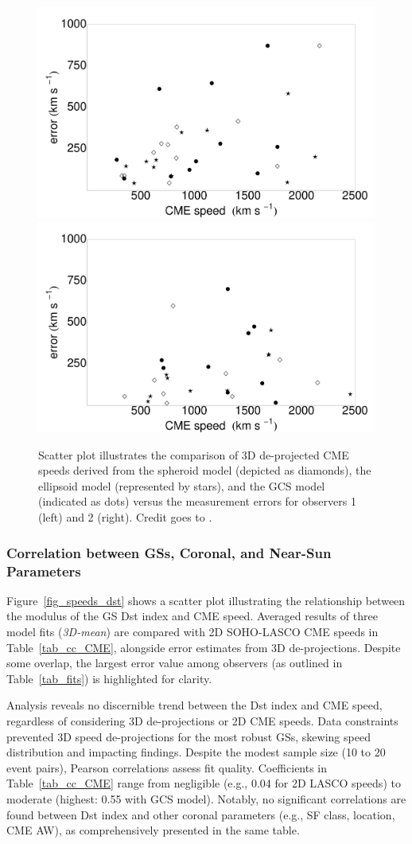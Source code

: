 \begin{figure}[!htp]
	\centering
	\includegraphics[width=0.48\hsize]{chapter2/figs/Fig_er_speed1.pdf}
	\includegraphics[width=0.48\hsize]{chapter2/figs/Fig_er_speed2.pdf}
	\caption{Scatter plot illustrates the comparison of 3D de-projected CME speeds derived from the spheroid model (depicted as diamonds), the ellipsoid model (represented by stars), and the GCS model (indicated as dots) versus the measurement errors for observers 1 (left) and 2 (right). Credit goes to \citet{miteva_2023}.}
	\label{fig_vcme_err}
\end{figure}

\subsubsection{Correlation between GSs, Coronal, and Near-Sun Parameters}
Figure~\ref{fig_speeds_dst} shows a scatter plot illustrating the relationship between the modulus of the GS Dst index and CME speed. Averaged results of three model fits (\textit{3D-mean}) are compared with 2D SOHO-LASCO CME speeds in Table~\ref{tab_cc_CME}, alongside error estimates from 3D de-projections. Despite some overlap, the largest error value among observers (as outlined in Table~\ref{tab_fits}) is highlighted for clarity.

Analysis reveals no discernible trend between the Dst index and CME speed, regardless of considering 3D de-projections or 2D CME speeds. Data constraints prevented 3D speed de-projections for the most robust GSs, skewing speed distribution and impacting findings. Despite the modest sample size (10 to 20 event pairs), Pearson correlations assess fit quality. Coefficients in Table~\ref{tab_cc_CME} range from negligible (e.g., 0.04 for 2D LASCO speeds) to moderate (highest: 0.55 with GCS model). Notably, no significant correlations are found between Dst index and other coronal parameters (e.g., SF class, location, CME AW), as comprehensively presented in the same table.


